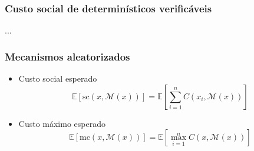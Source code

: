 \documentclass{beamer}
\begin{document}
\begin{frame}
\frametitle{Custo social de determinísticos verificáveis}
...
\end{frame}

\begin{frame}
\frametitle{Mecanismos aleatorizados}

\begin{itemize}
\item Custo social esperado\\ $$\mathbb{E}[ \text{sc}(x,\mathcal{M}(x)) ] = \mathbb{E}\left[ \sum\limits_{i=1}^n C(x_i,\mathcal{M}(x)) \right]$$
\item Custo máximo esperado\\ $$\mathbb{E}[ \text{mc}(x,\mathcal{M}(x)) ] = \mathbb{E}\left[ \max\limits_{i=1}^n C(x,\mathcal{M}(x)) \right]$$
\end{itemize}

\end{frame}

\begin{frame}
\end{frame}
\end{document}
